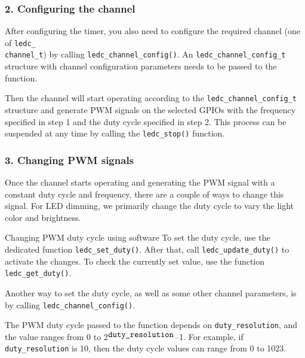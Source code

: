 \documentclass[a4paper,12pt]{book}
\begin{document}
\subsubsection{2. Configuring the channel}
After configuring the timer, you also need to configure the required channel (one of \verb|ledc_|\\ \verb|channel_t|) by calling \verb|ledc_channel_config()|. An \verb|ledc_channel_config_t| structure with channel configuration parameters needs to be passed to the function.

Then the channel will start operating according to the \verb|ledc_channel_config_t| structure and generate PWM signals on the selected GPIOs with the frequency specified in step 1 and the duty cycle specified in step 2. This process can be suspended at any time by calling the \verb|ledc_stop()| function.

\subsubsection{3. Changing PWM signals}
Once the channel starts operating and generating the PWM signal with a constant duty cycle and frequency, there are a couple of ways to change this signal. For LED dimming, we primarily change the duty cycle to vary the light color and brightness.

\begin{term}{Changing PWM duty cycle using software}
    To set the duty cycle, use the dedicated function \verb|ledc_set_duty()|. After that, call \verb|ledc_update_duty()| to activate the changes. To check the currently set value, use the function \verb|ledc_get_duty()|.

    \parskip 6pt
    Another way to set the duty cycle, as well as some other channel parameters, is by calling \verb|ledc_channel_config()|.

    The PWM duty cycle passed to the function depends on \verb|duty_resolution|, and the value ranges from 0 to 2$^{\verb|duty_resolution|}$--1. For example, if \verb|duty_resolution| is 10, then the duty cycle values can range from 0 to 1023.
\end{term}
\end{document}
